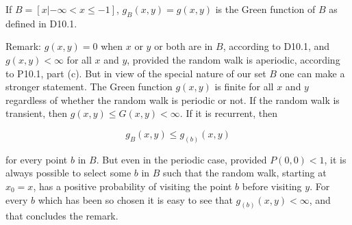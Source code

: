 If $B = [x| -\infty < x \leq -1]$, $g_B(x,y) = g(x,y)$ is the Green function of $B$ as defined in D10.1.

Remark: $g(x,y) = 0$ when $x$ or $y$ or both are in $B$, according to D10.1, and $g(x,y) < \infty$ for all $x$ and $y$, provided the random walk is aperiodic, according to P10.1, part (c). But in view of the special nature of our set $B$ one can make a stronger statement. The Green function $g(x,y)$ is finite for all $x$ and $y$ regardless of whether the random walk is periodic or not. If the random walk is transient, then $g(x,y) \leq G(x,y) < \infty$. If it is recurrent, then

$$g_B(x,y) \leq g_{(b)}(x,y)$$

for every point $b$ in $B$. But even in the periodic case, provided $P(0,0) < 1$, it is always possible to select some $b$ in $B$ such that the random walk, starting at $x_0 = x$, has a positive probability of visiting the point $b$ before visiting $y$. For every $b$ which has been so chosen it is easy to see that $g_{(b)}(x,y) < \infty$, and that concludes the remark.